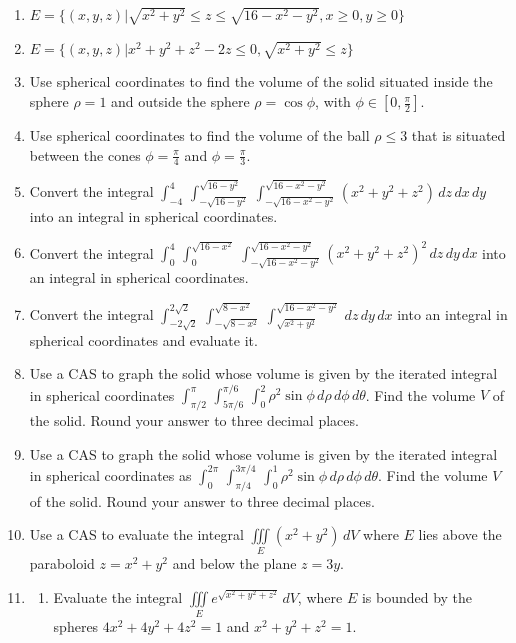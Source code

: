 \documentclass{exercises}
\begin{document}
\begin{enumerate}[resume]
\item $E=\{(x,y,z)|\sqrt{x^{2}+y^{2}}\le z\le \sqrt{16-x^{2}-y^{2}},x\ge0,y\ge0\}$
\item $E=\{(x,y,z)|x^{2}+y^{2}+z^{2}-2z\le0,\sqrt{x^{2}+y^{2}}\le z\}$
\item Use spherical coordinates to find the volume of the solid situated inside the sphere $\rho=1$ and outside the sphere $\rho=\cos \phi$, with $\phi \in[0,\frac{\pi}{2}]$.
\item Use spherical coordinates to find the volume of the ball $\rho \le3$ that is situated between the cones $\phi=\frac{\pi}{4}$ and $\phi=\frac{\pi}{3}$.
\item Convert the integral $\int_{-4}^{4}\,\int_{-\sqrt{16-y^{2}}}^{\sqrt{16-y^{2}}}\,\int_{-\sqrt{16-x^{2}-y^{2}}}^{\sqrt{16-x^{2}-y^{2}}}(x^{2}+y^{2}+z^{2})\,dz\,dx\,dy$ into an integral in spherical coordinates.
\item Convert the integral $\int_{0}^{4}\,\int_{0}^{\sqrt{16-x^{2}}}\,\int_{-\sqrt{16-x^{2}-y^{2}}}^{\sqrt{16-x^{2}-y^{2}}}{(x^{2}+y^{2}+z^{2})}^{2}\,dz\,dy\,dx$ into an integral in spherical coordinates.
\item Convert the integral $\int_{-2\sqrt{2}}^{2\sqrt{2}}\,\int_{-\sqrt{8-x^{2}}}^{\sqrt{8-x^{2}}}\,\int_{\sqrt{x^{2}+y^{2}}}^{\sqrt{16-x^{2}-y^{2}}}\,dz\,dy\,dx$ into an integral in spherical coordinates and evaluate it.
\item \techrequired Use a CAS to graph the solid whose volume is given by the iterated integral in spherical coordinates $\int_{\pi/2}^{\pi}\,\int_{5\pi/6}^{\pi/6}\,\int_{0}^{2}\rho^{2}\sin \phi \,d\rho \,d\phi \,d\theta$. Find the volume $V$ of the solid. Round your answer to three decimal places.
\item \techrequired Use a CAS to graph the solid whose volume is given by the iterated integral in spherical coordinates as $\int_{0}^{2\pi}\,\int_{\pi/4}^{3\pi/4}\,\int_{0}^{1}\rho^{2}\sin \phi \,d\rho \,d\phi \,d\theta$. Find the volume $V$ of the solid. Round your answer to three decimal places.
\item \techrequired Use a CAS to evaluate the integral $\underset{E}{\iiint}(x^{2}+y^{2})\,dV$ where $E$ lies above the paraboloid $z=x^{2}+y^{2}$ and below the plane $z=3y$.
\item \techrequired
\begin{enumerate}[label=(\alph*)]
  \item Evaluate the integral $\underset{E}{\iiint}e^{\sqrt{x^{2}+y^{2}+z^{2}}}\,dV$, where $E$ is bounded by the spheres $4x^{2}+4y^{2}+4z^{2}=1$ and $x^{2}+y^{2}+z^{2}=1$.

\end{enumerate}
\end{enumerate}
\end{document}
